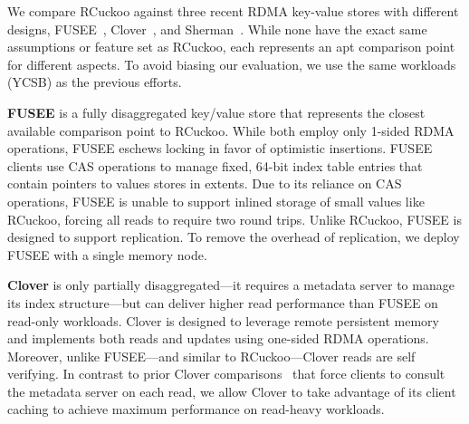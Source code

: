 
We compare RCuckoo against three recent RDMA key-value stores with
different designs, FUSEE~\cite{fusee}, Clover~\cite{clover}, and
Sherman~\cite{sherman}.  While none have the exact same assumptions or
feature set as RCuckoo, each represents an apt comparison point for
different aspects.  To avoid biasing our evaluation, we use the same
workloads (YCSB) as the previous efforts.
%

\textbf{FUSEE} is a fully disaggregated key/value store that
represents the closest available comparison point to RCuckoo.  While
both employ only 1-sided RDMA operations, FUSEE eschews locking in
favor of optimistic insertions.  FUSEE clients use CAS operations
to manage fixed, 64-bit index table entries that contain pointers to
values stores in extents.  Due to its reliance on CAS operations, FUSEE is unable to support inlined storage of small
values like RCuckoo, forcing all reads to require two round trips.
Unlike RCuckoo, FUSEE is designed to support replication.  To remove the overhead of replication, 
we deploy FUSEE with a single memory node.

\textbf{Clover} is only partially disaggregated---it requires a
metadata server to manage its index structure---but can deliver higher
read performance than FUSEE on read-only workloads.  Clover is
designed to leverage remote persistent memory and implements both
reads and updates using one-sided RDMA operations.  Moreover, unlike
FUSEE---and similar to RCuckoo---Clover reads are self verifying.
In contrast to prior Clover comparisons~\cite{fusee} that force
clients to consult the metadata server on each read, we allow Clover
to take advantage of its client caching to achieve maximum performance
on read-heavy workloads.

